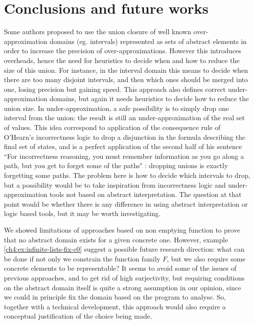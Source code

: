 \chapter{Conclusions and future works}

Some authors proposed  to use the union closure of well known over-approximation domains (eg. intervals) represented as sets of abstract elements in order to increase the precision of over-approximations. However this introduces overheads, hence the need for heuristics to decide when and how to reduce the size of this union. For instance, in the interval domain this means to decide when there are too many disjoint intervals, and then which ones should be merged into one, losing precision but gaining speed.
This approach also defines correct under-approximation domains, but again it needs heuristics to decide how to reduce the union size. In under-approximation, a safe possibility is to simply drop one interval from the union: the result is still an under-approximation of the real set of values. This idea correspond to application of the consequence rule of O'Hearn's incorrectness logic to drop a disjunction in the formula describing the final set of states, and is a perfect application of the second half of his sentence ``For incorrectness reasoning, you must remember information as you go along a path, but you get to forget some of the paths" \cite{ohearn-incorrectness-logic}: dropping unions is exactly forgetting some paths.
The problem here is how to decide which intervals to drop, but a possibility would be to take inspiration from incorrectness logic and under-approximation tools not based on abstract interpretation. The question at that point would be whether there is any difference in using abstract interpretation or logic based tools, but it may be worth investigating.

We showed limitations of approaches based on non emptying function to prove that no abstract domain exists for a given concrete one. However, example \ref{ch4:ex:infinite-lists-fix-c0} suggest a possible future research direction: what can be done if not only we constrain the function family $F$, but we also require some concrete elements to be representable? It seems to avoid some of the issues of previous approaches, and to get rid of high surjectivity, but requiring conditions on the abstract domain itself is quite a strong assumption in our opinion, since we could in principle fix the domain based on the program to analyse. So, together with a technical development, this approach would also require a conceptual justification of the choice being made.